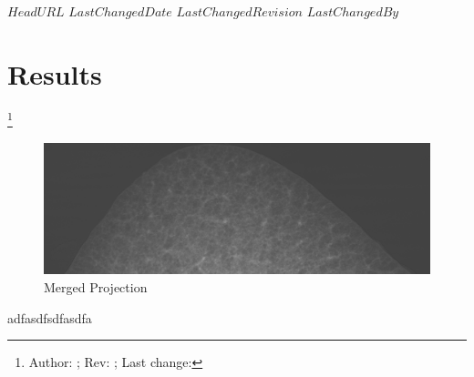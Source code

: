 \svnidlong
{$HeadURL$}
{$LastChangedDate$}
{$LastChangedRevision$}
{$LastChangedBy$}

\section{Results}
\footnote{Author: \svnauthor; Rev: \svnrev; Last change: \svndate}%
\begin{figure}[htbp]
	\centering
		\includegraphics[width=1.00\textwidth]{img/R108C36c_merge0801.png}
	\caption{Merged Projection}
	\label{fig:R108C36c_merge0801}
\end{figure}
adfasdfsdfasdfa
